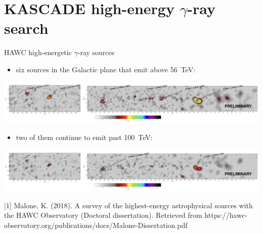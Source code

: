 \section{KASCADE high-energy \texorpdfstring{$\gamma$}{gamma}-ray search}

\begin{frame}{HAWC high-energetic $\gamma$-ray sources}

\begin{itemize}
  \item six sources in the Galactic plane that emit above 56~TeV:
\end{itemize}
\includegraphics[width=1\textwidth]{pics/HWC_above_56TeV.png}
\begin{itemize}
  \item two of them continue to emit past 100~TeV:
\end{itemize}
\includegraphics[width=1\textwidth]{pics/HWC_above_100TeV.png}

\small
[1] Malone, K. (2018). A survey of the highest-energy astrophysical sources with the HAWC Observatory (Doctoral dissertation).
Retrieved from https://hawc-observatory.org/publications/docs/Malone-Dissertation.pdf

\end{frame}

